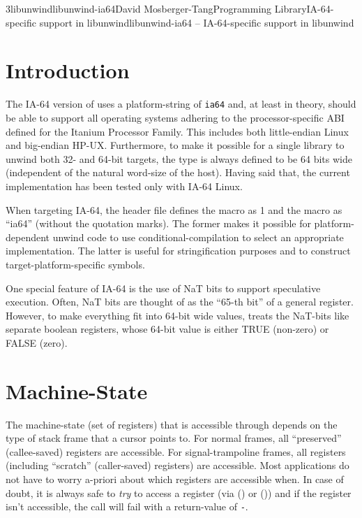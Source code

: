 \documentclass{article}
\begin{document}
\begin{Name}{3libunwind}{libunwind-ia64}{David Mosberger-Tang}{Programming Library}{IA-64-specific support in libunwind}libunwind-ia64 -- IA-64-specific support in libunwind
\end{Name}


\section{Introduction}

The IA-64 version of  uses a platform-string of
\texttt{ia64} and, at least in theory, should be able to support all
operating systems adhering to the processor-specific ABI defined for
the Itanium Processor Family.  This includes both little-endian Linux
and big-endian HP-UX.  Furthermore, to make it possible for a single
library to unwind both 32- and 64-bit targets, the type
 is always defined to be 64 bits wide (independent
of the natural word-size of the host).  Having said that, the current
implementation has been tested only with IA-64 Linux.

When targeting IA-64, the  header file defines the
macro  as 1 and the macro 
as ``ia64'' (without the quotation marks).  The former makes it
possible for platform-dependent unwind code to use
conditional-compilation to select an appropriate implementation.  The
latter is useful for stringification purposes and to construct
target-platform-specific symbols.

One special feature of IA-64 is the use of NaT bits to support
speculative execution.  Often, NaT bits are thought of as the ``65-th
bit'' of a general register.  However, to make everything fit into
64-bit wide  values,  treats the
NaT-bits like separate boolean registers, whose 64-bit value is either
TRUE (non-zero) or FALSE (zero).


\section{Machine-State}

The machine-state (set of registers) that is accessible through
 depends on the type of stack frame that a cursor
points to.  For normal frames, all ``preserved'' (callee-saved)
registers are accessible.  For signal-trampoline frames, all registers
(including ``scratch'' (caller-saved) registers) are accessible.  Most
applications do not have to worry a-priori about which registers are
accessible when.  In case of doubt, it is always safe to \emph{try} to
access a register (via () or
()) and if the register isn't accessible, the
call will fail with a return-value of \texttt{-}.
\end{document}
